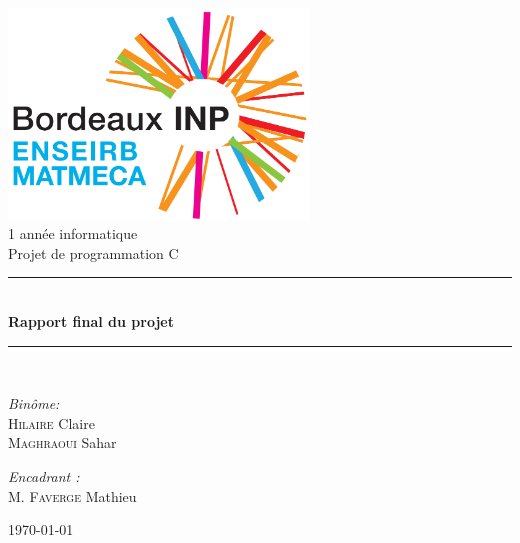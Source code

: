 \begin{titlepage}
\begin{center}
\includegraphics[width=0.6\textwidth]{figures/logo.png}\\[1cm]
{\large 1 année informatique}\\[1cm]
{\large Projet de programmation C}\\[1cm]
\rule{\linewidth}{0.5mm} \\[0.4cm]
{ \huge \bfseries Rapport final du projet   \\[0.4cm] }
\rule{\linewidth}{0.5mm} \\[1.5cm]
\noindent
\begin{minipage}{0.4\textwidth}
  \begin{flushleft} \large
    \emph{Binôme:}\\
    \textsc{Hilaire} Claire\\
    \textsc{Maghraoui} Sahar\\
  \end{flushleft}
\end{minipage}%
\begin{minipage}{0.4\textwidth}
  \begin{flushright} \large
    \emph{Encadrant :} \\
    M. \textsc{Faverge} Mathieu\\
    \textsc{}
  \end{flushright}
\end{minipage}
\vfill
{\large  \today}
\end{center}
\end{titlepage}